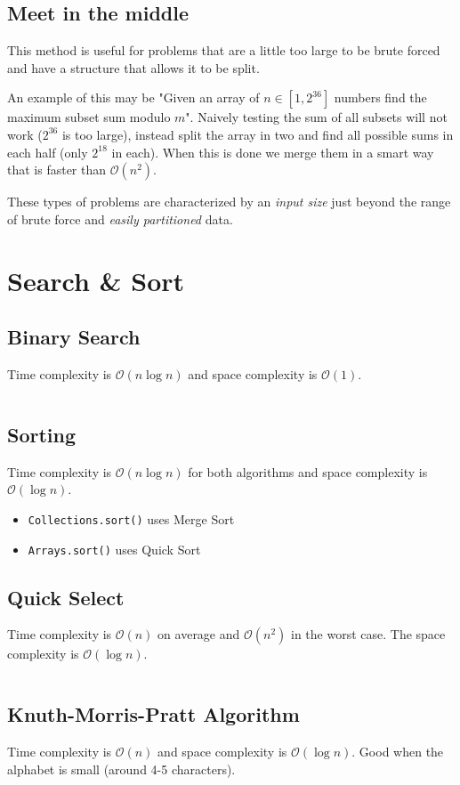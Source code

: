 \documentclass[8pt,a4paper,landscape,oneside]{amsart}
\newcommand{\code}[1]{\inputminted[fontsize=\normalsize,baselinestretch=1]{java}{code/#1}}
\newcommand{\bigO}{\mathcal{O}}
\begin{document}
\begin{multicols*}{3}
  \subsection{Meet in the middle}
  This method is useful for problems that are a little too large to be brute forced and have a structure that allows it to be split. 
  
  An example of this may be "Given an array of $n \in [1, 2^{36}]$ numbers find the maximum subset sum modulo $m$". Naively testing the sum of all subsets will not work ($2^{36}$ is too large), instead split the array in two and find all possible sums in each half (only $2^{18}$ in each). When this is done we merge them in a smart way that is faster than $\bigO(n^2)$.
  
  These types of problems are characterized by an \emph{input size} just beyond the range of brute force and \emph{easily partitioned} data.
  
  
\section{Search \& Sort}
  \subsection{Binary Search}
  Time complexity is $\bigO(n \log n)$ and space complexity is $\bigO(1)$.
  \code{Structures/BinarySearch.java}
  
  \subsection{Sorting}
  Time complexity is $\bigO(n \log n)$ for both algorithms and space complexity is $\bigO(\log n)$.
  \begin{itemize}
  \item \texttt{Collections.sort()} uses Merge Sort
  \item \texttt{Arrays.sort()} uses Quick Sort
  \end{itemize}
  
  \subsection{Quick Select}
  Time complexity is $\bigO(n)$ on average and $\bigO(n^2)$ in the worst case. The space complexity is $\bigO(\log n)$.
  \code{Structures/QuickSelect.java}
  
  \subsection{Knuth-Morris-Pratt Algorithm}
  Time complexity is $\bigO(n)$ and space complexity is $\bigO(\log n)$. Good when the alphabet is small (around 4-5 characters).
  \code{Structures/KMP.java}
  

\end{multicols*}
\end{document}
